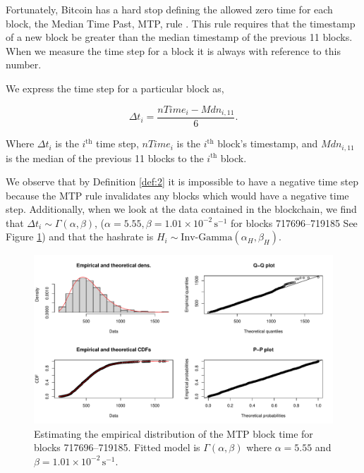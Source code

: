 \documentclass[runningheads]{llncs}
\begin{document}
Fortunately, Bitcoin has a hard stop defining the allowed zero time for each block, the Median Time Past, MTP, rule \cite{bitcoin2021core}.
This rule requires that the timestamp of a new block be greater than the median timestamp of the previous 11 blocks.
When we measure the time step for a block it is always with reference to this number.

We express the time step for a particular block as,
\begin{definition} \label{def:2}
    \begin{equation}
        \Delta t_i = \frac{nTime_i - Mdn_{i,11}}{6}.
    \end{equation}
\end{definition}
Where $\Delta t_i$ is the $i^{\mbox{th}}$ time step, $nTime_i$ is the $i^{\mbox{th}}$ block's timestamp, and $Mdn_{i,11}$ is the median of the previous 11 blocks to the $i^{\mbox{th}}$ block.

We observe that by Definition \ref{def:2} it is impossible to have a negative time step because the MTP rule invalidates any blocks which would have a negative time step.
Additionally, when we look at the data contained in the blockchain, we find that $\Delta t_i \sim \Gamma(\alpha, \beta)$, ($\alpha = 5.55, \beta = 1.01\times 10^{-2}\,\textrm{s}^{-1}$ for blocks 717696--719185 See Figure \ref{fig:4}) and that the hashrate is $H_i \sim \mbox{Inv-Gamma}(\alpha_H, \beta_H)$.
\begin{figure}
    \includegraphics[width=\textwidth]{BTC MTP Emperical Distribution Fit.pdf}
    \caption{
        Estimating the empirical distribution of the MTP block time for blocks 717696--719185.
        Fitted model is $\Gamma(\alpha,\beta)$ where $\alpha = 5.55$ and $\beta = 1.01\times 10^{-2}\,\textrm{s}^{-1}$.
    }\label{fig:4}
\end{figure}
\end{document}
